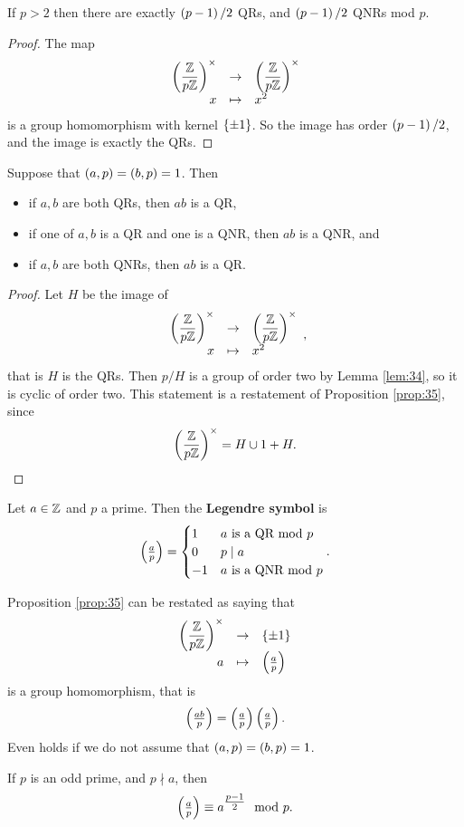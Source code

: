 \begin{lemma}
\label{lem:34}
If $ p > 2 $ then there are exactly $ \left( p - 1 \right) / 2 $ QRs, and $ \left( p - 1 \right) / 2 $ QNRs mod $ p $.
\end{lemma}

\begin{proof}
The map
$$ \function{\Unit{p}}{\Unit{p}}{x}{x^2} $$
is a group homomorphism with kernel $ \left\{ \pm 1 \right\} $. So the image has order $ \left( p - 1 \right) / 2 $, and the image is exactly the QRs.
\end{proof}

\begin{proposition}
\label{prop:35}
Suppose that $ \left( a, p \right) = \left( b, p \right) = 1 $. Then
\begin{itemize}
\item if $ a, b $ are both QRs, then $ ab $ is a QR,
\item if one of $ a, b $ is a QR and one is a QNR, then $ ab $ is a QNR, and
\item if $ a, b $ are both QNRs, then $ ab $ is a QR.
\end{itemize}
\end{proposition}

\begin{proof}
Let $ H $ be the image of
$$ \function{\Unit{p}}{\Unit{p}}{x}{x^2}, $$
that is $ H $ is the QRs. Then $ \unit{p} / H $ is a group of order two by Lemma \ref{lem:34}, so it is cyclic of order two. This statement is a restatement of Proposition \ref{prop:35}, since
$$ \left( \dfrac{\mathbb{Z}}{p\mathbb{Z}} \right)^\times = H \cup 1 + H. $$
\end{proof}

\begin{definition}
Let $ a \in \mathbb{Z} $ and $ p $ a prime. Then the \textbf{Legendre symbol} is
$$ \left( \tfrac{a}{p} \right) =
\begin{cases}
1 & a \ \text{is a QR mod} \ p \\
0 & p \mid a \\
-1 & a \ \text{is a QNR mod} \ p
\end{cases}.
$$
\end{definition}

Proposition \ref{prop:35} can be restated as saying that
$$ \function{\Unit{p}}{\cb{\pm 1}}{a}{\jacobi{a}{p}} $$
is a group homomorphism, that is
$$ \left( \tfrac{ab}{p} \right) = \left( \tfrac{a}{p} \right)\left( \tfrac{a}{p} \right). $$
Even holds if we do not assume that $ \left( a, p \right) = \left( b, p \right) = 1 $.


\begin{theorem}
If $ p $ is an odd prime, and $ p \nmid a $, then
$$ \left( \tfrac{a}{p} \right) \equiv a^{\tfrac{p - 1}{2}} \mod p. $$
\end{theorem}


